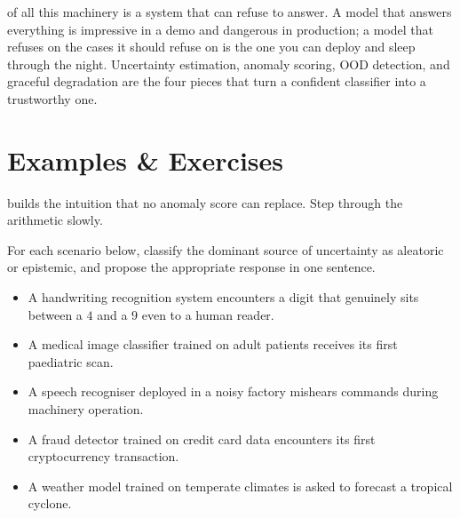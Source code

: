 
 of all this machinery is a system that can refuse to answer.
A model that answers everything is impressive in a demo and dangerous in production; a model that refuses on the cases it should refuse on is the one you can deploy and sleep through the night.
Uncertainty estimation, anomaly scoring, OOD detection, and graceful degradation are the four pieces that turn a confident classifier into a trustworthy one.



\newpage

\section{Examples \& Exercises}


 builds the intuition that no anomaly score can replace.
Step through the arithmetic slowly.

\vspace{1em}

For each scenario below, classify the dominant source of uncertainty as aleatoric or epistemic, and propose the appropriate response in one sentence.

\begin{itemize}
    \item A handwriting recognition system encounters a digit that genuinely sits between a $4$ and a $9$ even to a human reader.
    \item A medical image classifier trained on adult patients receives its first paediatric scan.
    \item A speech recogniser deployed in a noisy factory mishears commands during machinery operation.
    \item A fraud detector trained on credit card data encounters its first cryptocurrency transaction.
    \item A weather model trained on temperate climates is asked to forecast a tropical cyclone.
\end{itemize}

